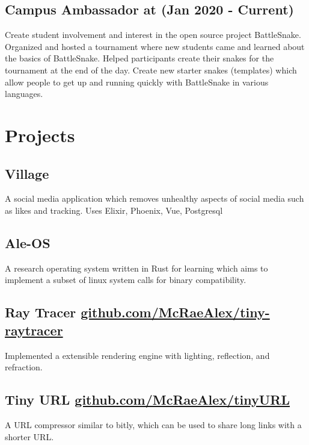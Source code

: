 \documentclass{article}
\newcommand{\hrefColored}[3]{\href{#2}{\color{#1}{#3}}}
\begin{document}
\subsection{Campus Ambassador at \hrefColored{blue}{https://github.com/McRaeAlex/AdventOfCode2018}{BattleSnake} (Jan 2020 - Current)}

Create student involvement and interest in the open source project BattleSnake.
Organized and hosted a tournament where new students came and learned about the 
basics of BattleSnake. Helped participants create their snakes for the tournament at the end of
the day. Create new starter snakes (templates) which allow people to get up and 
running quickly with BattleSnake in various languages.

\section{Projects}

\subsection{Village}

A social media application which removes unhealthy aspects of social media such as likes and tracking. Uses Elixir, Phoenix, Vue, Postgresql

\subsection{Ale-OS}

A research operating system written in Rust for learning which aims to implement a subset of linux system calls for binary compatibility.

\subsection{Ray Tracer \href{https://github.com/McRaeAlex/tiny-raytracer}{github.com/McRaeAlex/tiny-raytracer}}

Implemented a extensible rendering engine with lighting, reflection, and 
refraction.

\subsection{Tiny URL \href{https://github.com/McRaeAlex/tinyURL}{github.com/McRaeAlex/tinyURL}}

A URL compressor similar to bitly, which can be used to share long links with a 
shorter URL.
\end{document}
